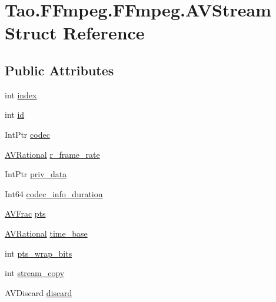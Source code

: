 \hypertarget{struct_tao_1_1_f_fmpeg_1_1_f_fmpeg_1_1_a_v_stream}{
\section{Tao.FFmpeg.FFmpeg.AVStream Struct Reference}
\label{struct_tao_1_1_f_fmpeg_1_1_f_fmpeg_1_1_a_v_stream}
}
\subsection*{Public Attributes}
\begin{DoxyCompactItemize}
\item 
int \hyperlink{struct_tao_1_1_f_fmpeg_1_1_f_fmpeg_1_1_a_v_stream_aefa59f90785cdcb018a21bf7845dc223}{index}
\item 
int \hyperlink{struct_tao_1_1_f_fmpeg_1_1_f_fmpeg_1_1_a_v_stream_a325d940a93ae615761dc5d14dfee15ee}{id}
\item 
IntPtr \hyperlink{struct_tao_1_1_f_fmpeg_1_1_f_fmpeg_1_1_a_v_stream_a06f24f928655991d0e2c02bf3fa55456}{codec}
\item 
\hyperlink{struct_tao_1_1_f_fmpeg_1_1_f_fmpeg_1_1_a_v_rational}{AVRational} \hyperlink{struct_tao_1_1_f_fmpeg_1_1_f_fmpeg_1_1_a_v_stream_a9db3cba7ae05cd3387ee56a75a4c38eb}{r\_\-frame\_\-rate}
\item 
IntPtr \hyperlink{struct_tao_1_1_f_fmpeg_1_1_f_fmpeg_1_1_a_v_stream_a070d7016352a04da992f3280294a3a4a}{priv\_\-data}
\item 
Int64 \hyperlink{struct_tao_1_1_f_fmpeg_1_1_f_fmpeg_1_1_a_v_stream_ac092d42ff4777626fcd5dc1553d366f3}{codec\_\-info\_\-duration}
\item 
\hyperlink{struct_tao_1_1_f_fmpeg_1_1_f_fmpeg_1_1_a_v_frac}{AVFrac} \hyperlink{struct_tao_1_1_f_fmpeg_1_1_f_fmpeg_1_1_a_v_stream_a2ae3f109bd370f48997b266549dbbad5}{pts}
\item 
\hyperlink{struct_tao_1_1_f_fmpeg_1_1_f_fmpeg_1_1_a_v_rational}{AVRational} \hyperlink{struct_tao_1_1_f_fmpeg_1_1_f_fmpeg_1_1_a_v_stream_a83bf14c985f8a9712d60e20aa501708a}{time\_\-base}
\item 
int \hyperlink{struct_tao_1_1_f_fmpeg_1_1_f_fmpeg_1_1_a_v_stream_a17d9762f0afbd89507765d5570c93947}{pts\_\-wrap\_\-bits}
\item 
int \hyperlink{struct_tao_1_1_f_fmpeg_1_1_f_fmpeg_1_1_a_v_stream_a5ec28ddf1f03623fbfe486aaee65d5d4}{stream\_\-copy}
\item 
AVDiscard \hyperlink{struct_tao_1_1_f_fmpeg_1_1_f_fmpeg_1_1_a_v_stream_aa94077cccff548456956cee7de239c1e}{discard}

\end{DoxyCompactItemize}
